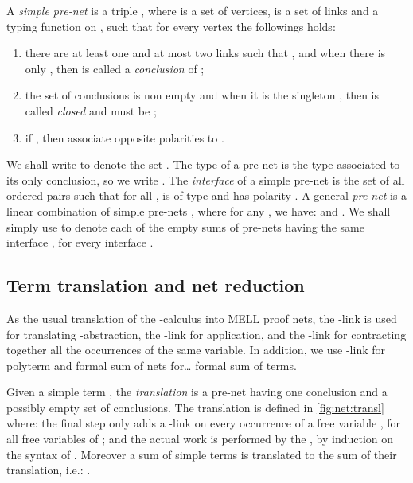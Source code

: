 \begin{definition} \label{def:prenet}
A \textit{simple pre-net}  is a triple ,
where  is a set of vertices,  is a set of links and  a 
typing function on , such that for every vertex  the followings 
holds:
\begin{enumerate}
\item
  there are at least one and at most two links  such that
  , and when there is only , then  is called a 
  \textit{conclusion} of ;
\item 
  the set  of conclusions is non empty and when it is the singleton 
  , then  is called \textit{closed} and  must be ;
\item
  if , then  associate opposite polarities to .
\end{enumerate}
We shall write  to denote the set .
The type of a pre-net  is the type  associated to its only  
conclusion, so we write .
The \textit{interface} of a simple pre-net  is the set  of 
all ordered pairs  such that for all ,  
is of type  and has polarity .
A general \textit{pre-net} is a linear combination of simple pre-nets
, where for any , we have:
 and 
.
We shall simply use  to denote each of the empty sums of pre-nets having 
the same interface , for every interface .
\end{definition}

\subsection{Term translation and net reduction}
\label{sec:nets:transl}

As the usual translation of the -calculus into MELL proof nets, 
the -link is used for translating -abstraction, the 
-link for application, and the -link for contracting together all 
the occurrences of the same variable.
In addition, we use -link for polyterm and formal sum of nets for\ldots 
formal sum of terms.

\begin{definition}\label{def:RIN:transl}
Given a simple term , the \textit{translation}  is a pre-net 
having one  conclusion and a possibly empty set of  conclusions.
The translation is defined in \autoref{fig:net:transl} where: the final step 
only adds a -link on every occurrence of a free variable , for all free 
variables of ; and the actual work is performed by the ,
by induction on the syntax of .
Moreover a sum of simple terms is translated to the sum of their translation, 
i.e.:
.
\end{definition}


